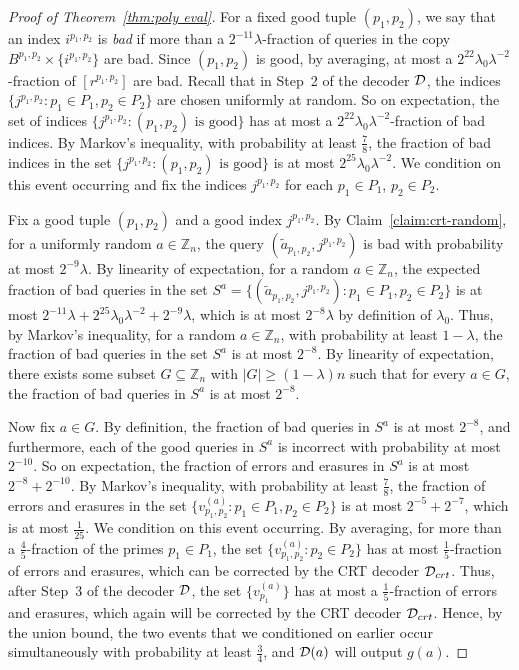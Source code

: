 \documentclass[11pt,english]{article}
\theoremstyle{definition}
\theoremstyle{remark}
\newcommand{\D}{{\cal D}}
\newcommand{\Z}{\mathbb{Z}}
\begin{document}
\begin{proof}[Proof of Theorem~\ref{thm:poly eval}]
For a fixed good tuple $(p_{1},p_{2})$, we say that an index $i^{p_{1},p_{2}}$
is \emph{bad} if more than a $2^{-11}\lambda$-fraction of queries in the
copy $B^{p_{1},p_{2}}\times\{i^{p_{1},p_{2}}\}$ are bad. Since $(p_{1},p_{2})$
is good, by averaging, at most a $2^{22}\lambda_0\lambda^{-2}$-fraction
of $[r^{p_{1},p_{2}}]$ are bad. Recall that in Step~2 of the decoder
$\D$, the indices $\{j^{p_{1},p_{2}}:p_{1}\in P_{1},p_{2}\in P_{2}\}$
are chosen uniformly at random. So on expectation, the set of indices
$\{j^{p_{1},p_{2}}:(p_{1},p_{2})\mbox{ is good}\}$ has at most a $2^{22}\lambda_0\lambda^{-2}$-fraction
of bad indices. By Markov's inequality, with probability at least
$\frac{7}{8}$, the fraction of bad indices in the set $\{j^{p_{1},p_{2}}:(p_{1},p_{2})\mbox{ is good}\}$
is at most $2^{25}\lambda_0\lambda^{-2}$. We condition on
this event occurring and fix the indices $j^{p_{1},p_{2}}$ for each
$p_{1}\in P_{1}$, $p_{2}\in P_{2}$.

Fix a good tuple $(p_{1},p_{2})$ and a good index $j^{p_{1},p_{2}}$.
By Claim~\ref{claim:crt-random}, for a uniformly random $a\in\Z_{n}$,
the query $(\tilde{a}_{p_{1},p_{2}},j^{p_{1},p_{2}})$ is bad with
probability at most $2^{-9} \lambda$. By linearity of expectation, for
a random $a\in\Z_{n}$, the expected fraction of bad queries in the
set $S^{a}=\{(\tilde{a}_{p_{1},p_{2}},j^{p_{1},p_{2}}):p_1\in P_1,p_2\in P_2\}$
is at most $2^{-11}\lambda+2^{25}\lambda_0\lambda^{-2}+2^{-9}\lambda$, which
is at most $2^{-8}\lambda$ by definition of $\lambda_0$. Thus, by Markov's
inequality, for a random $a\in\Z_{n}$, with probability at least
$1-\lambda$, the fraction of bad queries in the set $S^{a}$ is at most
$2^{-8}$. By linearity of expectation, there exists some subset $G\subseteq\Z_{n}$
with $|G|\geq(1-\lambda)n$ such that for every $a\in G$, the fraction of
bad queries in $S^{a}$ is at most $2^{-8}$. 

Now fix $a\in G$. By definition, the fraction of bad queries in $S^{a}$ is at
most $2^{-8}$, and furthermore, each of the good queries in $S^{a}$ is incorrect with probability
at most $2^{-10}$. So on expectation, the fraction of errors and
erasures in $S^{a}$ is at most $2^{-8}+2^{-10}$. By Markov's inequality, with
probability at least $\frac{7}{8}$, the fraction of errors and
erasures in the set $\{v_{p_{1},p_{2}}^{(a)}:p_{1}\in P_{1},p_{2}\in P_{2}\}$
is at most $2^{-5}+2^{-7}$, which is at most $\frac{1}{25}$. 
We condition on this event occurring. By averaging,
for more than a $\frac{4}{5}$-fraction of the primes $p_{1}\in P_{1}$,
the set $\{v_{p_{1},p_{2}}^{(a)}:p_{2}\in P_{2}\}$ has at most 
$\frac{1}{5}$-fraction of errors and erasures, which can be corrected
by the CRT decoder $\D_{crt}$. Thus, after Step~3 of the decoder
$\D$, the set $\{v_{p_{1}}^{(a)}\}$ has at most a $\frac{1}{5}$-fraction
of errors and erasures, which again will be corrected by the CRT decoder
$\D_{crt}$. Hence, by the union bound, the two events that we conditioned on
earlier occur simultaneously with probability at least $\frac{3}{4}$, and $\D(a)$ will
output $g(a)$. 
\end{proof}
\end{document}
